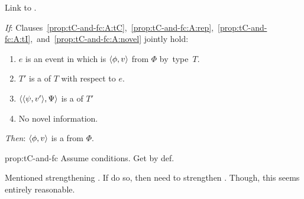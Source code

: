 \begin{note}
  Link \tC{} to .

  \begin{proposition}[\tC{2} and \fc{1}]
    \label{prop:tC-and-fc}

    \noindent%

    \begin{itenum}
    \item[\emph{If}:]
      Clauses~\ref{prop:tC-and-fc:A:tC},~\ref{prop:tC-and-fc:A:rep},~\ref{prop:tC-and-fc:A:tI},~and~\ref{prop:tC-and-fc:A:novel} jointly hold:
      \begin{enumerate}[label=\arabic*., ref=(\arabic*)]
      \item
        \label{prop:tC-and-fc:A:tC}
        \(e\) is an event in which \vAgent{} is  \(\langle \phi, v \rangle\) from \(\Phi\) by~type~\(T\).
      \item
        \label{prop:tC-and-fc:A:rep}
        \(T'\) is a \tRep{} of \(T\) with respect to \(e\).
      \item
        \label{prop:tC-and-fc:A:tI}
        \(\langle \langle \psi, v' \rangle, \Psi \rangle\) is a \tI{} of \(T'\)
      \item
        \label{prop:tC-and-fc:A:novel}
        No novel information.
      \end{enumerate}
    \item[\emph{Then}:]
      \(\langle \phi, v \rangle\) is a \fc{} from \(\Phi\).
    \end{itenum}
    \vspace{-\baselineskip}
  \end{proposition}

  \begin{argument}{prop:tC-and-fc}
    Assume conditions.
    Get \fc{} by def.
  \end{argument}

  Mentioned strengthening .
  If do so, then need to strengthen \tC{}.
  Though, this seems entirely reasonable.
\end{note}



